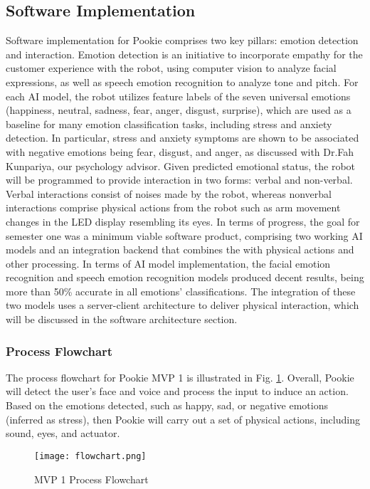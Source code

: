 \subsection{Software Implementation}
Software implementation for Pookie comprises two key pillars: emotion detection and interaction. Emotion detection is an initiative to incorporate empathy for the customer experience with the robot, using computer vision to analyze facial expressions, as well as speech emotion recognition to analyze tone and pitch. For each AI model, the robot utilizes feature labels of the seven universal emotions (happiness, neutral, sadness, fear, anger, disgust, surprise), which are used as a baseline for many emotion classification tasks, including stress and anxiety detection. In particular, stress and anxiety symptoms are shown to be associated with negative emotions being fear, disgust, and anger, as discussed with Dr.Fah Kunpariya, our psychology advisor. Given predicted emotional status, the robot will be programmed to provide interaction in two forms: verbal and non-verbal. Verbal interactions consist of noises made by the robot, whereas nonverbal interactions comprise physical actions from the robot such as arm movement changes in the LED display resembling its eyes. 
In terms of progress, the goal for semester one was a minimum viable software product, comprising two working AI models and an integration backend that combines the with physical actions and other processing. In terms of AI model implementation, the facial emotion recognition and speech emotion recognition models produced decent results, being more than 50\% accurate in all emotions’ classifications. The integration of these two models uses a server-client architecture to deliver physical interaction, which will be discussed in the software architecture section.

\subsubsection{Process Flowchart}
The process flowchart for Pookie MVP 1 is illustrated in Fig. \ref{fig:flowchart}. Overall, Pookie will detect the user’s face and voice and process the input to induce an action. Based on the emotions detected, such as happy, sad, or negative emotions (inferred as stress), then Pookie will carry out a set of physical actions, including sound, eyes, and actuator. 

\begin{figure}[ht]
    \centering
    \texttt{[image: flowchart.png]}
    \caption{MVP 1 Process Flowchart}
    \label{fig:flowchart}
\end{figure}

